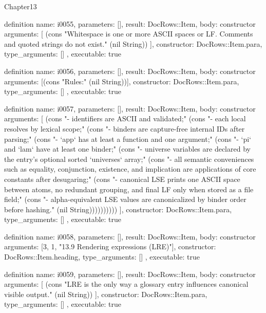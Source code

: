 \begin{lexlean}{Chapter13}
\begin{semanticmodule}
definition{
  name: i0055,
  parameters: [],
  result: DocRows::Item,
  body: constructor{
    arguments: [
      (cons "Whitespace is one or more ASCII spaces or LF. Comments and quoted strings do not exist." (nil String))
    ],
    constructor: DocRows::Item.para,
    type_arguments: []
  },
  executable: true
}

definition{
  name: i0056,
  parameters: [],
  result: DocRows::Item,
  body: constructor{
    arguments: [(cons "Rules:" (nil String))],
    constructor: DocRows::Item.para,
    type_arguments: []
  },
  executable: true
}

definition{
  name: i0057,
  parameters: [],
  result: DocRows::Item,
  body: constructor{
    arguments: [
      (cons "- identifiers are ASCII and validated;" (cons "- each local resolves by lexical scope;" (cons "- binders are capture-free internal IDs after parsing;" (cons "- `app` has at least a function and one argument;" (cons "- `pi` and `lam` have at least one binder;" (cons "- universe variables are declared by the entry's optional sorted `universes` array;" (cons "- all semantic conveniences such as equality, conjunction, existence, and implication are applications of core constants after desugaring;" (cons "- canonical LSE prints one ASCII space between atoms, no redundant grouping, and final LF only when stored as a file field;" (cons "- alpha-equivalent LSE values are canonicalized by binder order before hashing." (nil String))))))))))
    ],
    constructor: DocRows::Item.para,
    type_arguments: []
  },
  executable: true
}

definition{
  name: i0058,
  parameters: [],
  result: DocRows::Item,
  body: constructor{
    arguments: [3, 1, "13.9 Rendering expressions (LRE)"],
    constructor: DocRows::Item.heading,
    type_arguments: []
  },
  executable: true
}

definition{
  name: i0059,
  parameters: [],
  result: DocRows::Item,
  body: constructor{
    arguments: [
      (cons "LRE is the only way a glossary entry influences canonical visible output." (nil String))
    ],
    constructor: DocRows::Item.para,
    type_arguments: []
  },
  executable: true
}


\end{semanticmodule}
\end{lexlean}
